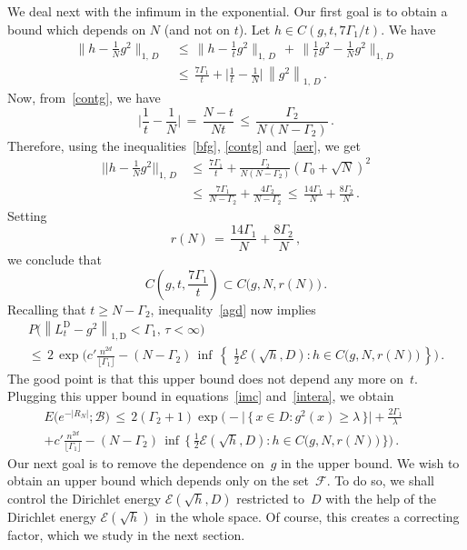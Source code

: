 \documentclass[AHL, Unicode, longabstracts, published]{cedram}
\newcommand*\tD{\mathrm{D}}%
\newcommand{\cB}{\mathcal{B}}
\newcommand{\cE}{\mathcal{E}}
\newcommand{\cF}{\mathcal{F}}
\begin{document}
We deal next with the infimum in the exponential. Our first goal is to obtain a bound which depends on $N$ (and not on $t$). Let $h\in C(g,t, {7\Gamma_1}/{t})$. We have
\begin{align*}
\Big\|h-\frac{1}{N}g^2\Big\|_{1,\,D}
\,&\leq\,
\Big\|h-\frac{1}{t}g^2\Big\|_{1,\,D}\,+\,
\Big\| \frac{1}{t}g^2-
\frac{1}{N}g^2\Big\|_{1,\,D}
\\
\,&\leq\,
\frac{7\Gamma_1}{t}+
\Big| \frac{1}{t}-
\frac{1}{N}\Big|\,\left\|g^2\right\|_{1,\,D}\,.
\end{align*}
Now, from~\eqref{contg}, we have
\[
\Big| \frac{1}{t}-
\frac{1}{N}\Big|\,=\,
\frac{N-t}{Nt}
\,\leq\,
\frac{\Gamma_2}{N(N-\Gamma_2)}\,.
\]
Therefore, using the inequalities~\eqref{bfg}, \eqref{contg} and~\eqref{aer}, we get
\begin{equation}\label{nbv}
\begin{aligned}
\Big|\Big|h-\frac{1}{N}g^2\Big|\Big|_{1,\,D} &\,\leq\,
\frac{7\Gamma_1}{t}+
\frac{\Gamma_2}{N(N-\Gamma_2)} \left(\Gamma_0+ \sqrt{N}\right)^2\\ &\,\leq\,
\frac{7\Gamma_1}{N-\Gamma_2}+
\frac{4\Gamma_2}{N-\Gamma_2}
\,\leq\,
\frac{14\Gamma_1}{N}+
\frac{8\Gamma_2}{N}
\,.
\end{aligned}
\end{equation}
Setting
\[
r(N)\,=\,
\frac{14\Gamma_1}{N}+
\frac{8\Gamma_2}{N}\,,
\]
we conclude that
\[
C\left(g,t, \frac{7\Gamma_1}{t}\right)
\subset C\big(g,N, r(N)\big)
\,.
\]
Recalling that $t\geq N-\Gamma_2$, inequality~\eqref{agd} now implies
\begin{multline*}
P\big(\left\|L_t^{\tD}-g^2\right\|_{1,\tD}<\Gamma_1,\,\tau<\infty
\big)\\ \leq\,2 \, \exp\Big(c'\frac{n^{2d}}{\lfloor\Gamma_1\rfloor} -(N-\Gamma_2)\,\inf\,\left\{\,
\,\frac{1}{2}\cE(\sqrt{h},D) :h\in C\big(g,N, r(N)\big)
\,\right\} \Big) \,.
\end{multline*}
The good point is that this upper bound does not depend any more on~$t$. Plugging this upper bound in equations~\eqref{imc} and~\eqref{intera}, we obtain
\begin{multline}\label{zbv}
E\big(e^{-|R_N|};\cB \big)
\,\leq\, 2(\Gamma_2+1)
\exp\Big(-
\big|\,\big\{\,x\in D:g^2(x)\geq\lambda\,\big\}\big| +\frac{2\Gamma_1}{\lambda}
\qquad
\\ + c'\frac{n^{2d}}{\lfloor\Gamma_1\rfloor} -(N-\Gamma_2)\,\inf\,\Big\{\,\frac{1}{2}\cE(\sqrt{h},D): h\in C\big(g,N, r(N)\big)
\,\Big\}\Big)
\,.\qquad
\end{multline}
Our next goal is to remove the dependence on~$g$ in the upper bound. We wish to obtain an upper bound which depends only on the set~$\cF$. To do so, we shall control the Dirichlet energy $\cE(\sqrt{h},D)$ restricted to~$D$ with the help of the Dirichlet energy $\cE(\sqrt{h})$ in the whole space. Of course, this creates a correcting factor, which we study in the next section.
\end{document}
